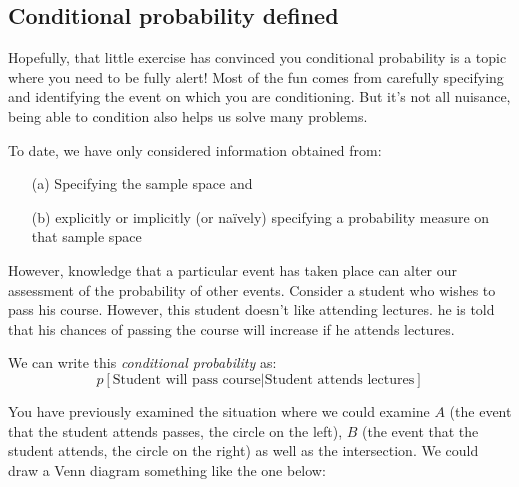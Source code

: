\documentclass[12pt]{extbook}
\begin{document}
  

\subsection{Conditional probability defined}

Hopefully, that little exercise has convinced you conditional probability is a topic where you need to be fully alert!   Most of the fun comes from carefully specifying and identifying the event on which you are conditioning.   But it's not all nuisance, being able to condition also helps us solve many problems.


To date, we have only considered information obtained from:


\begin{itemize}
\item[(a)] Specifying the sample space and
\item[(b)] explicitly or implicitly (or na\"ively) specifying a probability measure on that sample space
\end{itemize}

However, knowledge that a particular event has taken place can alter our assessment of the probability of other events.   Consider a student who wishes to pass his course.   However, this student doesn't like attending lectures.   he is told that his chances of passing the course will increase if he attends lectures.

We can write this \emph{conditional probability} as:
\begin{displaymath}
p[\mbox{Student will pass course} | \mbox{Student attends lectures}]
\end{displaymath}

 

You have previously examined the situation where we could examine $A$ (the event that the student attends passes, the circle on the left), $B$ (the event that the student attends, the circle on the right) as well as the intersection.   We could draw a Venn diagram something like the one below:


\def\firstcircle{(0,0) circle (1.5cm)}
\def\secondcircle{(0:2cm) circle (1.5cm)}



\setlength{\parskip}{5mm}
\end{document}
